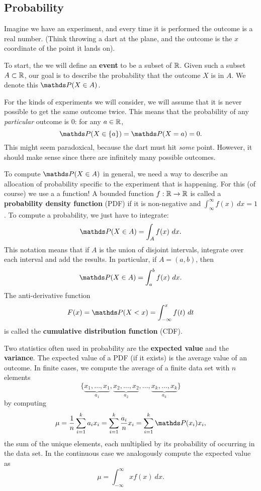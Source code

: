\subsection{Probability}

Imagine we have an experiment, and every time it is performed the outcome is a real number. (Think throwing a dart at the plane, and the outcome is the $x$ coordinate of the point it lands on). 

To start, the we will define an \textbf{event} to be a subset of $\mathbb{R}$. Given such a subset $A\subset\mathbb{R}$, our goal is to describe the probability that the outcome $X$ is in $A$. We denote this $\P(X\in A)$.


For the kinds of experiments we will consider, we will assume that it is never possible to get the same outcome twice. This means that the probability of any \textit{particular} outcome is 0: for any $a\in\mathbb{R}$, $$\P(X\in\{a\})=\P(X=a)=0.$$ 
This might seem paradoxical, because the dart must hit \textit{some} point. However, it should make sense since there are infinitely many possible outcomes.

To compute $\P(X\in A)$ in general, we need a way to describe an allocation of probability specific to the experiment that is happening. For this (of course) we use a a function! A bounded function $f:\mathbb{R} \to \mathbb{R}$ is called a \textbf{probability density function} (PDF) if it is non-negative and $\int_{\infty}^\infty f(x)\ dx= 1$. 
To compute a probability, we just have to integrate:
$$\P(X\in A) = \int_A f(x)\ dx.$$
This notation means that if $A$ is the union of disjoint intervals, integrate over each interval and add the results. In particular, if $A=(a,b)$, then 
$$\P(X\in A) = \int_a^b f(x)\ dx.$$
The anti-derivative function
$$F(x)=\P(X<x) = \int_{-\infty}^x f(t)\ dt$$
is called the \textbf{cumulative distribution function} (CDF).

Two statistics often used in probability are the \textbf{expected value} and the \textbf{variance}. The expected value of a PDF (if it exists) is the average value of an outcome. In finite cases, we compute the average of a finite data set with $n$ elements
$$\{\underbrace{x_1,\dots, x_1}_{a_1}, \underbrace{x_2,\dots, x_2}_{a_2},\dots, \underbrace{x_k,\dots, x_k}_{a_k}\}$$
by computing
$$\mu=\frac{1}{n}\sum_{i=1}^ka_ix_i=\sum_{i=1}^k\frac{a_i}{n}x_i =\sum_{i=1}^k\P(x_i)x_i,$$
the sum of the unique elements, each multiplied by its probability of occurring in the data set. In the continuous case we analogously compute the expected value as 
$$\mu=\int_{-\infty}^\infty xf(x)\ dx.$$

